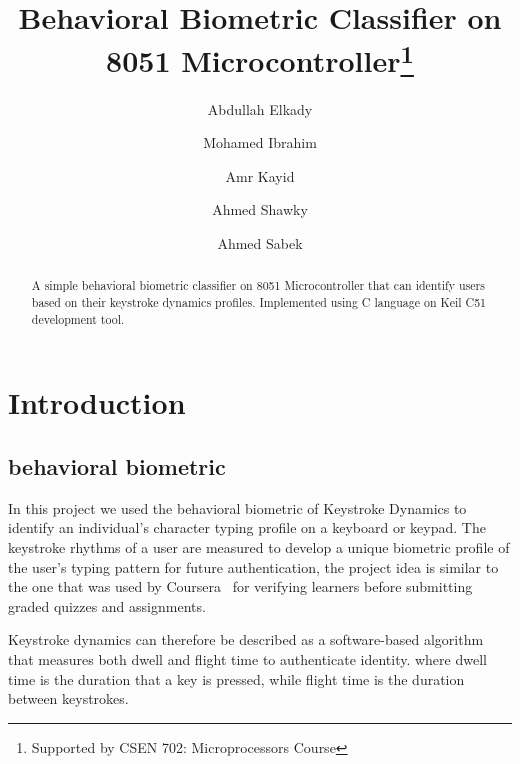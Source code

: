 \documentclass[runningheads]{llncs}
\begin{document}
%
\title{Behavioral Biometric Classifier on 8051 Microcontroller\thanks{Supported by CSEN 702: Microprocessors Course}}

\author{Abdullah Elkady \and Mohamed Ibrahim \and Amr Kayid \and Ahmed Shawky \and Ahmed Sabek}




\maketitle             


\begin{abstract}
A simple behavioral biometric classifier on 8051 Microcontroller that can identify users based on their keystroke dynamics profiles. Implemented using C language on Keil C51 development tool.

\end{abstract}

%
%
%

\section{Introduction}
\subsection{behavioral biometric}
In this project we used the behavioral biometric of Keystroke Dynamics to identify an individual's character typing profile on a keyboard or keypad. The keystroke rhythms of a user are measured to develop a unique biometric profile of the user's typing pattern for future authentication, the project idea is similar to the one that was used by Coursera~\cite{ref_article1} for verifying learners before submitting graded quizzes and assignments. \newline \newline \newline

Keystroke dynamics can therefore be described as a software-based algorithm that measures both dwell and flight time to authenticate identity. where dwell time is the duration that a key is pressed, while flight time is the duration between keystrokes. \newline \newline \newline \newline \newline
\end{document}
